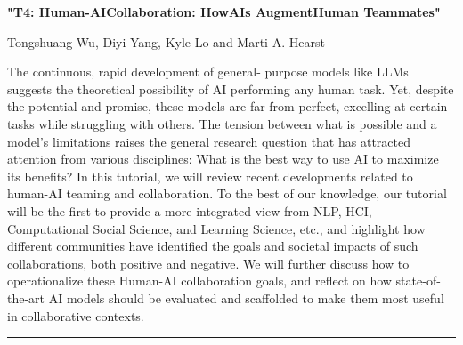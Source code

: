 \begin{center}
    \Large{\textbf{"T4: Human-AICollaboration: HowAIs AugmentHuman Teammates"}\\}
    \par\bigskip
    \large{Tongshuang Wu, Diyi Yang, Kyle Lo and Marti A. Hearst}\\
    \par\bigskip

\end{center}

The continuous, rapid development of general- purpose models like LLMs suggests the theoretical possibility of AI performing any human task. 
Yet, despite the potential and promise, these models are far from perfect, excelling at certain tasks while struggling with others. 
The tension between what is possible and a model's limitations raises the general research question that has attracted attention from various disciplines: What is the best way to use AI to maximize its benefits? In this tutorial, we will review recent developments related to human-AI teaming and collaboration. 
To the best of our knowledge, our tutorial will be the first to provide a more integrated view from NLP, HCI, Computational Social Science, and Learning Science, etc., and highlight how different communities have identified the goals and societal impacts of such collaborations, both positive and negative. We will further discuss how to operationalize these Human-AI collaboration goals, and reflect on how state-of-the-art AI models should be evaluated and scaffolded to make them most useful in collaborative contexts.
\begin{center}
    \noindent\rule{200px}{1pt}
\end{center}
